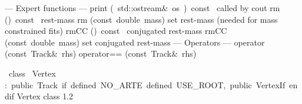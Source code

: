 \documentclass{article}
\begin{document}
\begin{cxxentry}
\begin{cxxclass}
\begin{cxxpublic}
        {--- Expert functions --- }
        {}
        {}
        {}
\label{cxx.1.1.73}
        {print}
        {(\ std::ostream\&\ os\ )\ const\ }
        { called by cout}
        {}
\label{cxx.1.1.74}
        {rm}
        {()\ const\ }
        { rest-mass}
        {}
\label{cxx.1.1.75}
        {rm}
        {(const\ double\ mass)}
        { set rest-mass (needed for mass constrained fits)}
        {}
\label{cxx.1.1.76}
        {rmCC}
        {()\ const\ }
        { conjugated rest-mass}
        {}
\label{cxx.1.1.77}
        {rmCC}
        {(const\ double\ mass)}
        { set conjugated rest-mass }
        {}
\label{cxx.1.1.78}
\cxxitem{}
        {--- Operators --- }
        {}
        {}
        {}
\label{cxx.1.1.79}
        {operator\<\ }
        {(const\ Track\&\ rhs)}
        {}
        {}
\label{cxx.1.1.80}
        {operator==}
        {(const\ Track\&\ rhs)}
        {}
        {}
\label{cxx.1.1.81}
\end{cxxpublic}
\end{cxxclass}
\begin{cxxclass}
{\ class\ }
        {Vertex}
        {:\ public\ Track\ if\ defined\ NO\_ARTE\ defined\ USE\_ROOT,\ public\ VertexIf\ endif}
        {Vertex class }
        {1.2}
\begin{cxxInheritance}

\end{cxxInheritance}
\end{cxxclass}
\end{cxxentry}
\end{document}
